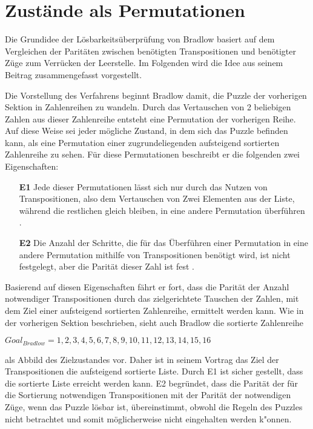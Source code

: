 
\section{Zustände als Permutationen} %
\label{sec:Permutation}
Die Grundidee der Lösbarkeitsüberprüfung von Bradlow basiert auf dem Vergleichen der Paritäten zwischen benötigten Transpositionen und benötigter Züge zum Verrücken der Leerstelle. Im Folgenden wird die Idee aus seinem Beitrag \autocite{Unsolvable-14-15-Numberphile-YT:online} zusammengefasst vorgestellt.\WNL

Die Vorstellung des Verfahrens beginnt Bradlow damit, die Puzzle der vorherigen Sektion in Zahlenreihen zu wandeln. Durch das Vertauschen von 2 beliebigen Zahlen aus dieser Zahlenreihe entsteht eine Permutation der vorherigen Reihe. Auf diese Weise sei jeder mögliche Zustand, in dem sich das Puzzle befinden kann, als eine Permutation einer zugrundeliegenden aufsteigend sortierten Zahlenreihe zu sehen. Für diese Permutationen beschreibt er die folgenden zwei Eigenschaften:
\begin{enumerate}
	\item[\textbf{E1}] Jede dieser Permutationen lässt sich nur durch das Nutzen von Transpositionen, also dem Vertauschen von Zwei Elementen aus der Liste, während die restlichen gleich bleiben, in eine andere Permutation überführen \cite[Vgl.][7min,07sec]{Unsolvable-14-15-Numberphile-YT:online}.
	\item[\textbf{E2}] Die Anzahl der Schritte, die für das Überführen einer Permutation in eine andere Permutation mithilfe von Transpositionen benötigt wird, ist nicht festgelegt, aber die Parität dieser Zahl ist fest \cite[Vgl.][10min,13sec]{Unsolvable-14-15-Numberphile-YT:online}.
\end{enumerate}
Basierend auf diesen Eigenschaften fährt er fort, dass die Parität der Anzahl notwendiger Transpositionen durch das zielgerichtete Tauschen der Zahlen, mit dem Ziel einer aufsteigend sortierten Zahlenreihe, ermittelt werden kann. Wie in der vorherigen Sektion beschrieben, sieht auch Bradlow die sortierte Zahlenreihe
\begin{center}
	$Goal_{Bradlow} = {1,2,3,4,5,6,7,8,9,10,11,12,13,14,15,16}$
\end{center}
als Abbild des Zielzustandes vor. Daher ist in seinem Vortrag das Ziel der Transpositionen die aufsteigend sortierte Liste. Durch E1 ist sicher gestellt, dass die sortierte Liste erreicht werden kann. E2 begründet, dass die Parität der für die Sortierung notwendigen Transpositionen mit der Parität der notwendigen Züge, wenn das Puzzle lösbar ist, übereinstimmt, obwohl die Regeln des Puzzles nicht betrachtet und somit möglicherweise nicht eingehalten werden k"onnen.\WNL
